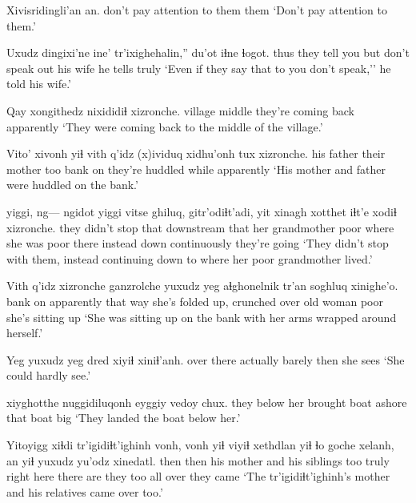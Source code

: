 \documentclass[12pt]{article}
\begin{document}
\gll Xivisridingli'an  an.
{don't pay attention to them} them
\glt `Don't pay attention to them.'
\glend

\gll Uxudz dingixi'ne    ine' tr'ixighehalin,''  du'ot    iɬne     ɬogot.
thus  {they tell you} but  {don't speak out} {his wife} {he tells} truly
\glt `Even if they say that to you don't speak,'' he told his wife.'
\glend

\gll Qay     xongithedz nixididiɬ           xizronche.
village middle    {they're coming back} apparently
\glt `They were coming back to the middle of the village.'
\glend

\gll Vito'      xivonh       yiɬ vith q'idz {(x)ividuq xidhu'onh}  tux xizronche.
{his father} {their mother} too bank on  {they're huddled} while apparently
\glt `His mother and father were huddled on the bank.'
\glend

 yiggi, ng---  ngidot  yiggi   vitse           ghiluq, gitr'odiɬt'adi, yit   xinagh  xotthet iɬt'e        xodiɬ xizronche. 
{they didn't stop} that {} downstream that {her grandmother} poor   {where she was poor} there instead down    continuously {they're going}
\glt `They didn't stop with them, instead continuing down to where her poor grandmother lived.'
\glend

\gll Vith q'idz xizronche ganzrolche {yuxudz yeg} aɬghonelnik                    tr'an     soghluq xinighe'o.
bank on    apparently         {} {that way}  {she's folded up, crunched over} {old woman} poor  {she's sitting up}
\glt `She was sitting up on the bank with her arms wrapped around herself.'
\glend

\gll Yeg {yuxudz yeg} dred   xiyiɬ xiniɬ'anh.
{over there} actually    barely then  {she sees}
\glt `She could hardly see.'
\glend

 xiyghotthe nuggidiluqonh          eyggiy vedoy chux. 
{} {they below her} {brought boat ashore} that   boat  big
\glt `They landed the boat below her.'
\glend

\gll Yitoyigg xiɬdi tr'igidiɬt'ighinh vonh, vonh yiɬ {viyiɬ xethdlan} yiɬ ɬo goche xelanh, an   yiɬ yuxudz yu'odz xinedatl.    
then    then   {}               {his mother} {} and {his siblings}   too  {truly} {right here}       {there are}  they too all    over   {they came}
\glt `The tr'igidiɬt'ighinh's mother and his relatives came over too.'
\glend
\end{document}
